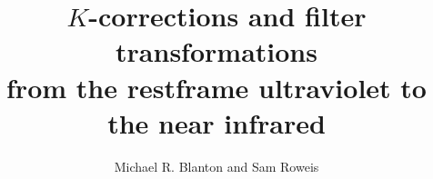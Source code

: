 \documentclass[10pt,preprint]{aastex}
\begin{document}
 
\title{$K$-corrections and filter transformations \\
from the restframe
ultraviolet to the near infrared}

\author{
Michael R. Blanton\altaffilmark{\ref{NYU}} and 
Sam Roweis
}
\end{document}
